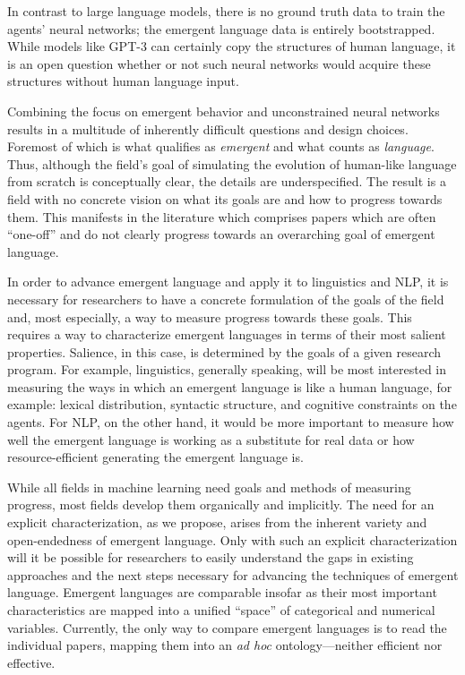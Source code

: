 In contrast to large language models,
    there is no ground truth data to train the agents' neural networks; the emergent language data is entirely bootstrapped.
While models like GPT-3 can certainly copy the structures of human language, it is an open question whether or not such neural networks would acquire these structures without human language input.

Combining the focus on emergent behavior and unconstrained neural networks results in a multitude of inherently difficult questions and design choices.
Foremost of which is what qualifies as \emph{emergent} and what counts as \emph{language}.
Thus, although the field's goal of simulating the evolution of human-like language from scratch is conceptually clear, the details are underspecified.
The result is a field with no concrete vision on what its goals are and how to progress towards them.
This manifests in the literature which comprises papers which are often ``one-off'' and do not clearly progress towards an overarching goal of emergent language.

In order to advance emergent language and apply it to linguistics and NLP, it is necessary for researchers to have a concrete formulation of the goals of the field and, most especially, a way to measure progress towards these goals.
This requires a way to characterize emergent languages in terms of their most salient properties.
Salience, in this case, is determined by the goals of a given research program.
For example, linguistics, generally speaking, will be most interested in measuring the ways in which an emergent language is like a human language, for example: lexical distribution, syntactic structure, and cognitive constraints on the agents.
For NLP, on the other hand, it would be more important to measure how well the emergent language is working as a substitute for real data or how resource-efficient generating the emergent language is.

While all fields in machine learning need goals and methods of measuring progress, most fields develop them organically and implicitly.
The need for an explicit characterization, as we propose, arises from the inherent variety and open-endedness of emergent language.
Only with such an explicit characterization will it be possible for researchers to easily understand the gaps in existing approaches and the next steps necessary for advancing the techniques of emergent language.
Emergent languages are comparable  insofar as their most important characteristics are mapped into a unified ``space'' of categorical and numerical variables.
Currently, the only way to compare emergent languages is to read the individual papers, mapping them into an \emph{ad hoc} ontology---neither efficient nor effective.

